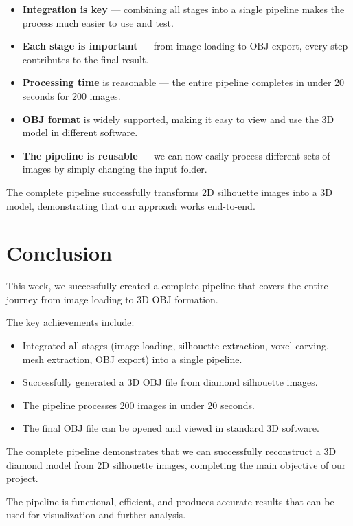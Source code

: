\documentclass[a4paper,12pt]{article}
\begin{document}
\begin{itemize}
    \item \textbf{Integration is key} — combining all stages into a single pipeline makes the process much easier to use and test.
    \item \textbf{Each stage is important} — from image loading to OBJ export, every step contributes to the final result.
    \item \textbf{Processing time} is reasonable — the entire pipeline completes in under 20 seconds for 200 images.
    \item \textbf{OBJ format} is widely supported, making it easy to view and use the 3D model in different software.
    \item \textbf{The pipeline is reusable} — we can now easily process different sets of images by simply changing the input folder.
\end{itemize}

The complete pipeline successfully transforms 2D silhouette images into a 3D model, demonstrating that our approach works end-to-end.

\section{Conclusion}

This week, we successfully created a complete pipeline that covers the entire journey from image loading to 3D OBJ formation.  

The key achievements include:

\begin{itemize}
    \item Integrated all stages (image loading, silhouette extraction, voxel carving, mesh extraction, OBJ export) into a single pipeline.
    \item Successfully generated a 3D OBJ file from diamond silhouette images.
    \item The pipeline processes 200 images in under 20 seconds.
    \item The final OBJ file can be opened and viewed in standard 3D software.
\end{itemize}

The complete pipeline demonstrates that we can successfully reconstruct a 3D diamond model from 2D silhouette images, completing the main objective of our project.  

The pipeline is functional, efficient, and produces accurate results that can be used for visualization and further analysis.
\end{document}

